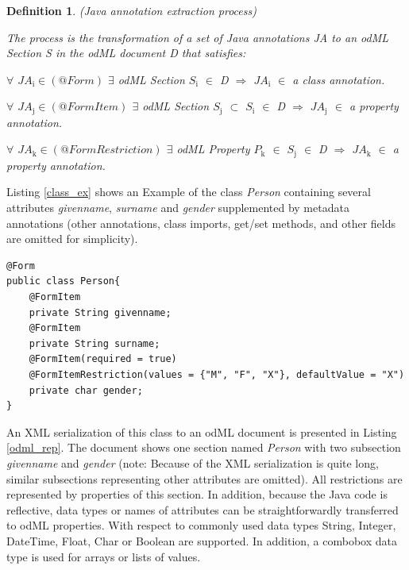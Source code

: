 \documentclass[a4paper,twoside]{article}
\newtheorem{definition}{Definition}
\begin{document}
\begin{definition}
\label{def:Java_annotation_extraction_process}
(Java annotation extraction process)

\emph{The process is the transformation of a set of Java annotations JA to an odML Section S in the odML document D that satisfies:}

\emph{$\forall$ $JA{}_{\text{i}}\in {(@Form)}$ $\exists$ odML Section $S{}_{\text{i}}$ $\in$ D $\Rightarrow$ $JA{}_{\text{i}}$ $\in$ a class annotation}.

\emph{$\forall$ $JA{}_{\text{j}}\in {(@FormItem)}$ $\exists$ odML Section $S{}_{\text{j}}$ $\subset$ $S{}_{\text{i}}$ $\in$ D $\Rightarrow$ $JA{}_{\text{j}}$ $\in$ a property
annotation}.

\emph{$\forall$ $JA{}_{\text{k}}\in {(@FormRestriction)}$ $\exists$ odML Property $P{}_{\text{k}}$ $\in$ $S{}_{\text{j}}$ $\in$ D $\Rightarrow$ $JA{}_{\text{k}}$ $\in$ a property  annotation}.

\end{definition}


Listing \ref{class_ex} shows an Example of the class \textit{Person} containing several attributes \textit{givenname}, \textit{surname} and \textit{gender} supplemented by metadata annotations (other annotations, class imports, get/set methods, and other fields are omitted for simplicity).



\scriptsize
\begin{lstlisting}[label=class_ex,caption=Java Class Example]
@Form
public class Person{
	@FormItem
	private String givenname;
	@FormItem
	private String surname;
	@FormItem(required = true)
	@FormItemRestriction(values = {"M", "F", "X"}, defaultValue = "X")
	private char gender;
}
\end{lstlisting}
\normalsize


An XML serialization of this class to an odML document is presented in Listing \ref{odml_rep}. The document shows one section named \textit{Person} with two subsection \textit{givenname} and \textit{gender} (note: Because of the XML serialization is quite long, similar subsections representing other attributes are omitted). All restrictions are represented by properties of this section. In addition, because the Java code is reflective, data types or names of attributes can be straightforwardly transferred to odML properties. With respect to commonly used data types String, Integer, DateTime, Float, Char or Boolean are supported. In addition, a combobox data type is used for arrays or lists of values.
\end{document}
